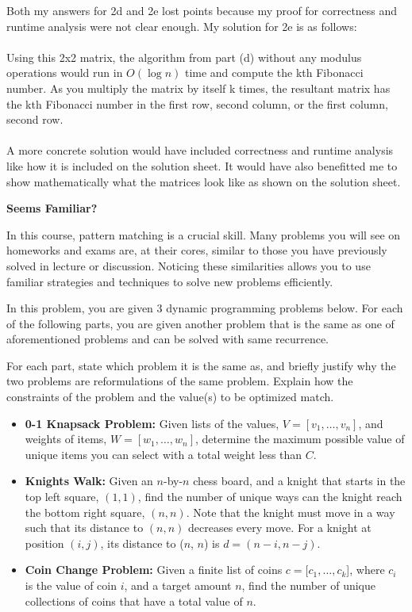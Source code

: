 \documentclass[11pt,addpoints,answers]{exam}
\begin{document}
\begin{questions}
  \begin{solution}
  Both my answers for 2d and 2e lost points because my proof for correctness and runtime analysis were not clear enough. My solution for 2e is as follows: \\
  \\
  Using this 2x2 matrix, the algorithm from part (d) without any modulus operations would run in $O(\log n)$ time and compute the kth Fibonacci number. As you multiply the matrix by itself k times, the resultant matrix has the kth Fibonacci number in the first row, second column, or the first column, second row.\\
  \\
  A more concrete solution would have included correctness and runtime analysis like how it is included on the solution sheet. It would have also benefitted me to show mathematically what the matrices look like as shown on the solution sheet.
  
  \end{solution}

\pagebreak
\question \textbf{Seems Familiar?} 

  In this course, pattern matching is a crucial skill. Many problems you will see on homeworks and exams are, at their cores, similar to those you have previously solved in lecture or discussion. Noticing these similarities allows you to use familiar strategies and techniques to solve new problems efficiently.
  
  In this problem, you are given 3 dynamic programming problems below. For each of the following parts, you are given another problem that is the same as one of aforementioned problems and can be solved with same recurrence. 
  
  For each part, state which problem it is the same as, and briefly justify why the two problems are reformulations of the same problem. Explain how the constraints of the problem and the value(s) to be optimized match. 

  \begin{itemize}
    \item \textbf{0-1 Knapsack Problem:} Given lists of the values, $V = [v_1,\ldots,v_n]$, and weights of items, $W = [w_1,\ldots,w_n]$, determine the maximum possible value of unique items you can select with a total weight less than $C$.
    \item \textbf{Knights Walk:} Given an $n$-by-$n$ chess board, and a knight that starts in the top left square, $(1, 1)$, find the number of unique ways can the knight reach the bottom right square, $(n, n)$. Note that the knight must move in a way such that its distance to $(n, n)$ decreases every move. For a knight at position $(i, j)$, its distance to ($n$, $n$) is $d = (n - i, n-j)$.
    \item \textbf{Coin Change Problem:} Given a finite list of coins $c = [c_1,\ldots,c_k$], where $c_i$ is the value of coin $i$, and a target amount $n$, find the number of unique collections of coins that have a total value of $n$. 
  \end{itemize}


\end{questions}
\end{document}
